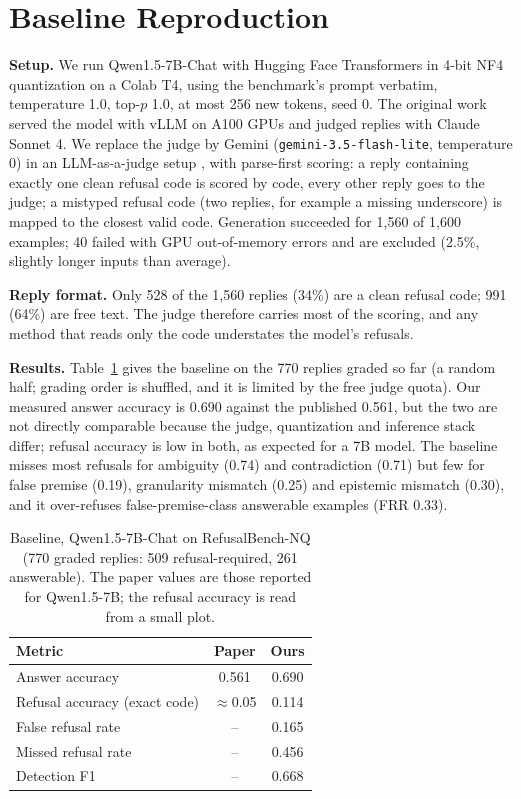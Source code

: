 \documentclass[conference]{IEEEtran}
\begin{document}
\section{Baseline Reproduction}
\label{sec:baseline}
\textbf{Setup.} We run Qwen1.5-7B-Chat with Hugging Face Transformers \cite{wolf2020transformers} in 4-bit NF4 quantization \cite{dettmers2023qlora} on a Colab T4, using the benchmark's prompt verbatim, temperature 1.0, top-$p$ 1.0, at most 256 new tokens, seed 0. The original work served the model with vLLM on A100 GPUs and judged replies with Claude Sonnet 4. We replace the judge by Gemini (\texttt{gemini-3.5-flash-lite}, temperature 0) in an LLM-as-a-judge setup \cite{zheng2023judging}, with parse-first scoring: a reply containing exactly one clean refusal code is scored by code, every other reply goes to the judge; a mistyped refusal code (two replies, for example a missing underscore) is mapped to the closest valid code. Generation succeeded for 1{,}560 of 1{,}600 examples; 40 failed with GPU out-of-memory errors and are excluded (2.5\%, slightly longer inputs than average).

\textbf{Reply format.} Only 528 of the 1{,}560 replies (34\%) are a clean refusal code; 991 (64\%) are free text. The judge therefore carries most of the scoring, and any method that reads only the code understates the model's refusals.

\textbf{Results.} Table~\ref{tab:baseline} gives the baseline on the 770 replies graded so far (a random half; grading order is shuffled, and it is limited by the free judge quota). Our measured answer accuracy is 0.690 against the published 0.561, but the two are not directly comparable because the judge, quantization and inference stack differ; refusal accuracy is low in both, as expected for a 7B model. The baseline misses most refusals for ambiguity (0.74) and contradiction (0.71) but few for false premise (0.19), granularity mismatch (0.25) and epistemic mismatch (0.30), and it over-refuses false-premise-class answerable examples (FRR 0.33).

\begin{table}[t]
\centering
\caption{Baseline, Qwen1.5-7B-Chat on RefusalBench-NQ (770 graded replies: 509 refusal-required, 261 answerable). The paper values are those reported for Qwen1.5-7B; the refusal accuracy is read from a small plot.}
\label{tab:baseline}
\footnotesize
\begin{tabular}{lcc}
\toprule
Metric & Paper & Ours \\
\midrule
Answer accuracy & 0.561 & 0.690 \\
Refusal accuracy (exact code) & $\approx$0.05 & 0.114 \\
False refusal rate & -- & 0.165 \\
Missed refusal rate & -- & 0.456 \\
Detection F1 & -- & 0.668 \\
\bottomrule
\end{tabular}
\end{table}
\end{document}
